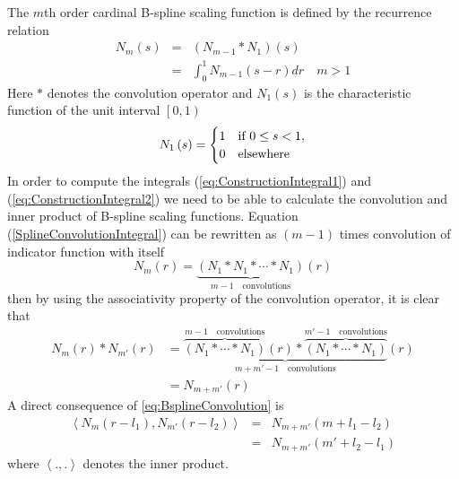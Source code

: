 \documentclass[journal,a4paper]{IEEEtran}
\begin{document}
The  $m$th order cardinal B-spline scaling function is defined by the recurrence relation \cite{Chui1992} 
\begin{eqnarray}
N_{m}\left(s\right)&=&\left(N_{m-1}\ast N_{1}\right)\left(s\right)\nonumber \\
&=&\int_0^{1} N_{m-1}\left( s-r\right)dr \quad m>1 
\label{SplineConvolutionIntegral}
\end{eqnarray}
Here $\ast$ denotes the convolution operator and $N_1\left(s\right)$ is the characteristic function of the unit interval  $\left[ 0,1\right) $
\begin{equation}
N_{1}\left(s\right)=
\begin{cases}
1 & \text{if $ 0\le s<1$}, \\
0 & \mathrm{elsewhere}
\end{cases}
\end{equation}
In order to compute the  integrals (\ref{eq:ConstructionIntegral1}) and (\ref{eq:ConstructionIntegral2}) we need to be able to calculate the convolution and inner product of B-spline scaling functions. Equation (\ref{SplineConvolutionIntegral}) can be rewritten as $(m-1)$ times convolution of indicator function with itself 
\begin{equation}
 N_{m}\left(r\right)=\underbrace{\left(N_{1}\ast N_{1}\ast \cdots \ast N_{1}\right)}_{m-1\quad \text{convolutions}}\left(r\right)
\end{equation}
then by using the associativity property of the convolution operator, it is clear that
\setlength{\arraycolsep}{0.0em}
\begin{align}\label{eq:BsplineConvolution}
N_{m}\left( r\right) \ast N_{m'}\left(r\right)&=\underbrace{\overbrace{\left(N_{1} \ast \cdots \ast N_{1}\right)}^{m-1 \quad \text{convolutions}}\left(r\right) \ast \overbrace{\left(N_{1} \ast \cdots \ast N_{1}\right)}^{m'-1\quad \text{convolutions}}}_{m+m'-1 \quad \text{convolutions}}\left(r\right)\nonumber\\
&=N_{m+m'}\left(r\right)
\end{align}
A direct consequence of \eqref{eq:BsplineConvolution} is 
\begin{eqnarray}
 \left\langle N_{m}\left(r-l_{1}\right), N_{m'}\left(r-l_{2}\right)\right\rangle&=&N_{m+m'}\left(m+l_{1}-l_{2}\right)\nonumber \\
&=&N_{m+m'}\left(m'+l_{2}-l_{1}\right)
\label{eq:BsplineInnerProduct}
\end{eqnarray}
where $\left\langle  .,.\right\rangle $ denotes the inner product.
\end{document}

